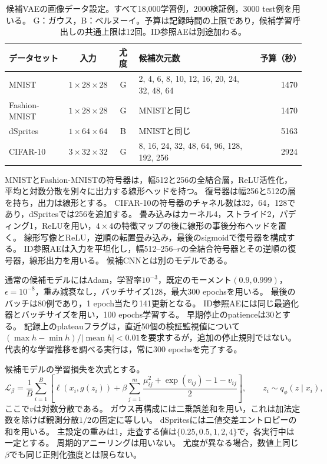 \documentclass[11pt,a4paper]{ltjsarticle}
\begin{document}
\begin{table}[H]
\caption{候補VAEの画像データ設定。すべて18,000学習例，2000検証例，3000 test例を用いる。
G：ガウス，B：ベルヌーイ。予算は記録時間の上限であり，候補学習呼出しの共通上限は12回。ID参照AEは別途加わる。}
\label{tab:data}\small
\begin{tabularx}{\textwidth}{lccXr}\toprule
データセット & 入力 & 尤度 & 候補次元数 & 予算（秒） \\\midrule
MNIST & $1\times28\times28$ & G & 2, 4, 6, 8, 10, 12, 16, 20, 24, 32, 48, 64 & 1470 \\
Fashion-MNIST & $1\times28\times28$ & G & MNISTと同じ & 1470 \\
dSprites & $1\times64\times64$ & B & MNISTと同じ & 5163 \\
CIFAR-10 & $3\times32\times32$ & G & 8, 16, 24, 32, 48, 64, 96, 128, 192, 256 & 2924 \\
\bottomrule\end{tabularx}
\end{table}

MNISTとFashion-MNISTの符号器は，幅512と256の全結合層，ReLU活性化，
平均と対数分散を別々に出力する線形ヘッドを持つ。
復号器は幅256と512の層を持ち，出力は線形とする。
CIFAR-10の符号器のチャネル数は32，64，128であり，dSpritesでは256を追加する。
畳み込みはカーネル4，ストライド2，パディング1，ReLUを用い，$4\times4$の特徴マップの後に線形の事後分布ヘッドを置く。
線形写像とReLU，逆順の転置畳み込み，最後のsigmoidで復号器を構成する。
ID参照AEは入力を平坦化し，幅512--256--$r$の全結合符号器とその逆順の復号器，線形出力を用いる。
候補CNNとは別のモデルである。

通常の候補モデルにはAdam，学習率$10^{-3}$，既定のモーメント$(0.9,0.999)$，
$\epsilon=10^{-8}$，重み減衰なし，バッチサイズ128，最大300 epochsを用いる。
最後のバッチは80例であり，1 epoch当たり141更新となる。
ID参照AEには同じ最適化器とバッチサイズを用い，100 epochs学習する。
早期停止のpatienceは30とする。
記録上のplateauフラグは，直近50個の検証監視値について
$(\max h-\min h)/|\operatorname{mean}h|<0.01$を要求するが，追加の停止規則ではない。
代表的な学習推移を調べる実行は，常に300 epochsを完了する。

候補モデルの学習損失を次式とする。
\begin{equation}
 \mathcal L_\beta=\frac1B\sum_{i=1}^B
 \left[\ell(x_i,g(z_i))+\beta\sum_{j=1}^{m}
 \frac{\mu_{ij}^2+\exp(v_{ij})-1-v_{ij}}{2}\right],
 \qquad z_i\sim q_\phi(z\mid x_i),
 \label{eq:loss}
\end{equation}
ここで$v$は対数分散である。
ガウス再構成には二乗誤差和を用い，これは加法定数を除けば観測分散$1/2$の固定に等しい。
dSpritesには二値交差エントロピーの和を用いる。
主設定の重みは1，走査する値は$\{0.25,0.5,1,2,4\}$で，各実行中は一定とする。
周期的アニーリング\cite{fu2019cyclical}は用いない。
尤度が異なる場合，数値上同じ$\beta$でも同じ正則化強度とは限らない。
\end{document}
